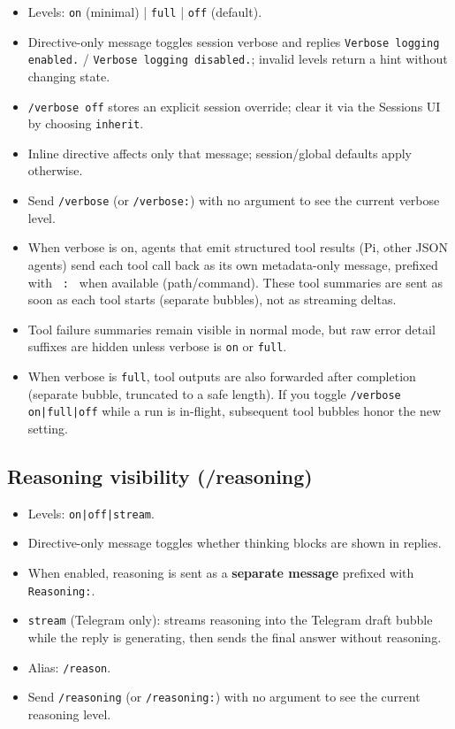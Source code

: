 \begin{itemize}
  \item Levels: \texttt{on} (minimal) | \texttt{full} | \texttt{off} (default).
  \item Directive-only message toggles session verbose and replies \texttt{Verbose logging enabled.} / \texttt{Verbose logging disabled.}; invalid levels return a hint without changing state.
  \item \texttt{/verbose off} stores an explicit session override; clear it via the Sessions UI by choosing \texttt{inherit}.
  \item Inline directive affects only that message; session/global defaults apply otherwise.
  \item Send \texttt{/verbose} (or \texttt{/verbose:}) with no argument to see the current verbose level.
  \item When verbose is on, agents that emit structured tool results (Pi, other JSON agents) send each tool call back as its own metadata-only message, prefixed with \texttt{ : } when available (path/command). These tool summaries are sent as soon as each tool starts (separate bubbles), not as streaming deltas.
  \item Tool failure summaries remain visible in normal mode, but raw error detail suffixes are hidden unless verbose is \texttt{on} or \texttt{full}.
  \item When verbose is \texttt{full}, tool outputs are also forwarded after completion (separate bubble, truncated to a safe length). If you toggle \texttt{/verbose on|full|off} while a run is in-flight, subsequent tool bubbles honor the new setting.
\end{itemize}


\subsection{Reasoning visibility (/reasoning)}


\begin{itemize}
  \item Levels: \texttt{on|off|stream}.
  \item Directive-only message toggles whether thinking blocks are shown in replies.
  \item When enabled, reasoning is sent as a \textbf{separate message} prefixed with \texttt{Reasoning:}.
  \item \texttt{stream} (Telegram only): streams reasoning into the Telegram draft bubble while the reply is generating, then sends the final answer without reasoning.
  \item Alias: \texttt{/reason}.
  \item Send \texttt{/reasoning} (or \texttt{/reasoning:}) with no argument to see the current reasoning level.
\end{itemize}


